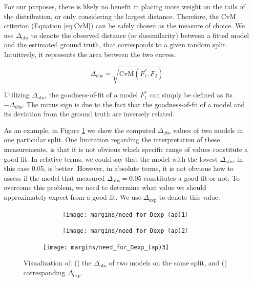 For our purposes, there is likely no benefit in placing more weight on the tails of the distribution, or only considering the largest distance. Therefore, the CvM criterion (Equation \ref{eq:CvM}) can be safely chosen as the measure of choice. We use $\Delta_\text{obs}$ to denote the observed distance (or dissimilarity) between a fitted model and the estimated ground truth, that corresponds to a given random split. Intuitively, it represents the area between the two curves.

\begin{equation}\label{eq:Delta_obs}
	\Delta_\text{obs} = \sqrt{\text{CvM}\left(F_1^*, F_2\right)}
\end{equation}


Utilizing $\Delta_\text{obs}$, the goodness-of-fit of a model $F_1^*$ can simply be defined as its $-\Delta_\text{obs}$. The minus sign is due to the fact that the goodness-of-fit of a model and its deviation from the ground truth are inversely related. 

As an example, in Figure \ref{fig:motivate_delta_exp_A} we show the computed $\Delta_\text{obs}$ values of two models in one particular split. One limitation regarding the interpretation of these measurements, is that it is not obvious which specific range of values constitute a good fit. In relative terms, we could say that the model with the lowest $\Delta_\text{obs}$, in this case 0.05, is better. However, in absolute terms, it is not obvious how to assess if the model that measured $\Delta_\text{obs}=0.05$ constitutes a good fit or not. To overcome this problem, we need to determine what value we should approximately expect from a good fit. We use $\Delta_\text{exp}$ to denote this value.

\begin{figure}[t]	
	\centering
	\begin{subfigure}{.666\textwidth}
		\begin{subfigure}{.5\textwidth}
			\centering
			\texttt{[image: margins/need\_for\_Dexp\_(ap)1]}
		\end{subfigure}%
		\begin{subfigure}{.5\textwidth}
			\centering
			\texttt{[image: margins/need\_for\_Dexp\_(ap)2]}
		\end{subfigure}%
		\caption{}
		\label{fig:motivate_delta_exp_A}
	\end{subfigure}%
	\begin{subfigure}{.333\textwidth}
		\centering
		\texttt{[image: margins/need\_for\_Dexp\_(ap)3]}		
		\caption{}
		\label{fig:motivate_delta_exp_B}
	\end{subfigure}
	\caption{Visualization of: () the $\Delta_\text{obs}$ of two models on the same split, and () corresponding $\Delta_\text{exp}$.}
\end{figure}

